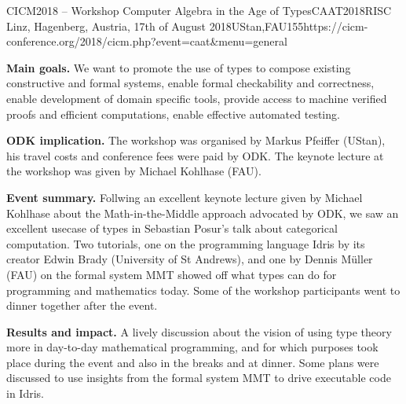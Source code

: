 \begin{event}{CICM2018 -- Workshop Computer Algebra in the Age of Types}{CAAT2018}{RISC Linz, Hagenberg, Austria, 17th of August 2018}{UStan,FAU}{15}{5}{https://cicm-conference.org/2018/cicm.php?event=caat&menu=general}

\textbf{Main goals.} We want to promote the use of types to compose existing
constructive and formal systems, enable formal checkability and correctness,
enable development of domain specific tools, provide access to machine verified
proofs and efficient computations, enable effective automated testing.

\textbf{ODK implication.} The workshop was organised by Markus Pfeiffer (UStan), his
travel costs and conference fees were paid by ODK. The keynote lecture at the
workshop was given by Michael Kohlhase (FAU).

\textbf{Event summary.} Follwing an excellent keynote lecture given by Michael
Kohlhase about the Math-in-the-Middle approach advocated by ODK, we saw an
excellent usecase of types in Sebastian Posur's talk about categorical
computation. Two tutorials, one on the programming language Idris by its creator
Edwin Brady (University of St Andrews), and one by Dennis Müller (FAU) on the
formal system MMT showed off what types can do for programming and mathematics
today.
Some of the workshop participants went to dinner together after the event.

\textbf{Results and impact.} A lively discussion about the vision of using type
theory more in day-to-day mathematical programming, and for which purposes took
place during the event and also in the breaks and at dinner.
Some plans were discussed to use insights from the formal system MMT to drive
executable code in Idris.

\end{event}
